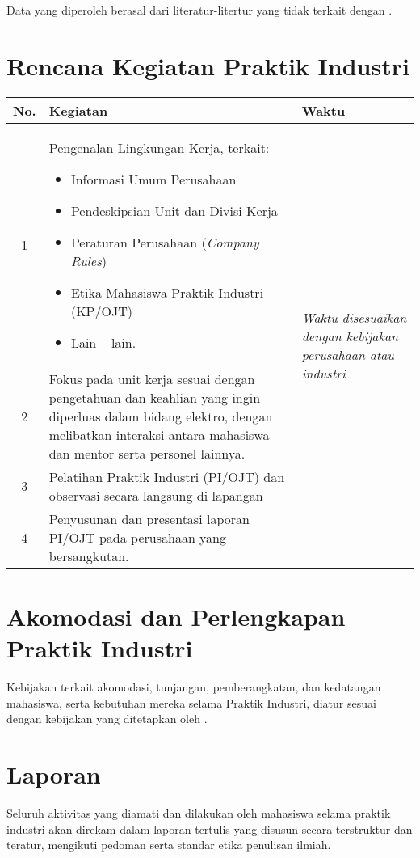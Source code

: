 Data yang diperoleh berasal dari literatur-litertur yang tidak terkait dengan {\perusahaan}.


\section{Rencana Kegiatan Praktik Industri}

\begin{tabular}{|c|m{8.5cm}|m{4cm}|}
    \hline
    \textbf{No.} & \textbf{Kegiatan} & \textbf{Waktu} \\ \hline
    1 & Pengenalan Lingkungan Kerja, terkait:
    \begin{itemize}
        \item Informasi Umum Perusahaan
        \item Pendeskipsian Unit dan Divisi Kerja
        \item Peraturan Perusahaan (\textit{Company Rules})
        \item Etika Mahasiswa Praktik Industri (KP/OJT)
        \item Lain – lain.
    \end{itemize}
    & \multirow{4}{4cm}{\textit{Waktu disesuaikan dengan kebijakan perusahaan atau industri}} \\ \cline{1-2}
    2 & Fokus pada unit kerja sesuai dengan pengetahuan dan keahlian yang ingin diperluas dalam bidang elektro, dengan melibatkan interaksi antara mahasiswa dan mentor serta personel lainnya. & \\ \cline{1-2}
    3 & Pelatihan Praktik Industri (PI/OJT) dan observasi secara langsung di lapangan & \\ \cline{1-2}
    4 & Penyusunan dan presentasi laporan PI/OJT pada perusahaan yang bersangkutan. & \\ \hline
\end{tabular}

\section{Akomodasi dan Perlengkapan Praktik Industri}

Kebijakan terkait akomodasi, tunjangan, pemberangkatan, dan kedatangan mahasiswa, serta kebutuhan mereka selama Praktik Industri, diatur sesuai dengan kebijakan yang ditetapkan oleh {\perusahaan}.

\section{Laporan}

Seluruh aktivitas yang diamati dan dilakukan oleh mahasiswa selama praktik industri akan direkam dalam laporan tertulis yang disusun secara terstruktur dan teratur, mengikuti pedoman serta standar etika penulisan ilmiah.